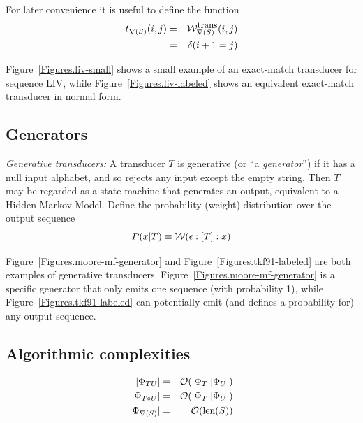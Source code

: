 \documentclass{article}
\newcommand{\seclabel}[1]{\label{sec.#1}}
\newcommand{\figref}[1]{Figure~\ref{Figures.#1}}
\newcommand\gappedalphabet[1]{(\Omega_{#1} \cup \{\epsilon\})}
\newcommand\gapsquared{\gappedalphabet{}^2}
\newcommand\wtrans[4]{#1(#2 : [#3] : #4)}
\newcommand\compose{}
\newcommand\fork{\circ}
\newcommand\recognize{\nabla}
\newcommand\States{\Phi}
\newcommand\statesof[1]{\States_{#1}}
\newcommand\weight{{\cal W}}
\newcommand\weightfunof[1]{\weight_{#1}}
\newcommand\transweightfun[1]{\weightfunof{#1}^{\mbox{\small trans}}}
\newcommand\numberofstates[1]{|\statesof{#1}|}
\newcommand\seqlen[1]{\mbox{len}(#1)}
\newcommand\order[1]{{\cal O}(#1)}
\newcommand\profTrans[1]{t_{#1}}
\begin{document}
For later convenience it is useful to define the function
\begin{eqnarray*}
\profTrans{\recognize(S)}(i,j) & = & \transweightfun{\recognize(S)}(i,j) \\
& = & \delta(i+1 = j)
\end{eqnarray*}

\figref{liv-small} shows a small example of an exact-match transducer for sequence LIV,
while \figref{liv-labeled} shows an equivalent exact-match transducer in normal form.




\subsection{Generators}
\seclabel{GenSinglet}
{\em Generative transducers:}
A transducer $T$ is generative (or ``a {\em generator}'') if it has a null input alphabet, and so rejects any input except the empty string.
Then $T$ may be regarded as a state machine that generates an output, equivalent to a Hidden Markov Model.
Define the probability (weight) distribution over the output sequence
\[
P(x|T) \equiv \wtrans{\weight}{\epsilon}{T}{x}
\]

\figref{moore-mf-generator} and \figref{tkf91-labeled} are both examples of generative transducers.
\figref{moore-mf-generator} is a specific generator that only emits one sequence (with probability 1),
while \figref{tkf91-labeled} can potentially emit (and defines a probability for) any output sequence.



\subsection{Algorithmic complexities}
\begin{eqnarray*}
\numberofstates{T \compose U} & = & \order{\numberofstates{T} \numberofstates{U}} \\
\numberofstates{T \fork U} & = & \order{\numberofstates{T} \numberofstates{U}} \\
\numberofstates{\recognize(S)} & = & \order{\seqlen{S}}
\end{eqnarray*}
\end{document}
